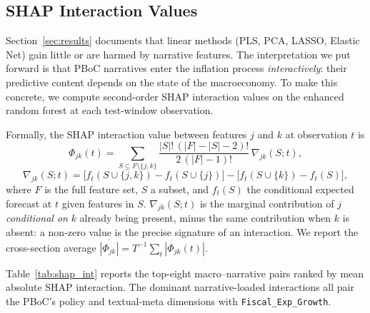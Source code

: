 \documentclass[AER]{AEA}
\begin{document}
\subsection{SHAP Interaction Values}\label{ssec:shap_int}

Section~\ref{sec:results} documents that linear methods (PLS, PCA, LASSO,
Elastic Net) gain little or are harmed by narrative features. The
interpretation we put forward is that PBoC narratives enter the inflation
process \emph{interactively}: their predictive content depends on the
state of the macroeconomy. To make this concrete, we compute second-order
SHAP interaction values \citep{lundberg2017unified} on the enhanced random
forest at each test-window observation.

Formally, the SHAP interaction value between features $j$ and $k$ at
observation $t$ is
\begin{equation}
\Phi_{jk}(t) = \sum_{S \subseteq F\setminus\{j,k\}}
  \frac{|S|!\,(|F|-|S|-2)!}{2\,(|F|-1)!}\,
  \nabla_{jk}(S; t),
\label{eq:shap_int}
\end{equation}
\begin{equation*}
\nabla_{jk}(S; t) =
\bigl[f_t(S\cup\{j,k\}) - f_t(S\cup\{j\})\bigr]
- \bigl[f_t(S\cup\{k\}) - f_t(S)\bigr],
\end{equation*}
where $F$ is the full feature set, $S$ a subset, and $f_t(S)$ the
conditional expected forecast at $t$ given features in $S$.
$\nabla_{jk}(S; t)$ is the marginal contribution of $j$ \emph{conditional
on} $k$ already being present, minus the same contribution when $k$ is
absent: a non-zero value is the precise signature of an interaction. We
report the cross-section average $\overline{|\Phi_{jk}|} = T^{-1}\sum_t
|\Phi_{jk}(t)|$.

Table~\ref{tab:shap_int} reports the top-eight macro--narrative pairs
ranked by mean absolute SHAP interaction. The dominant narrative-loaded
interactions all pair the PBoC's policy and textual-meta dimensions with
\texttt{Fiscal\_Exp\_Growth}.
\end{document}
